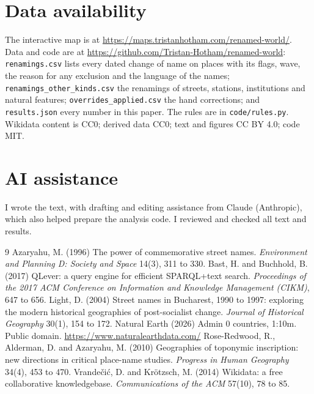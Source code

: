 \documentclass[11pt,a4paper]{article}
\begin{document}
\section{Data availability}
The interactive map is at \url{https://maps.tristanhotham.com/renamed-world/}. Data and code are at \url{https://github.com/Tristan-Hotham/renamed-world}: \texttt{renamings.csv} lists every dated change of name on places with its flags, wave, the reason for any exclusion and the language of the names; \texttt{renamings\_other\_kinds.csv} the renamings of streets, stations, institutions and natural features; \texttt{overrides\_applied.csv} the hand corrections; and \texttt{results.json} every number in this paper. The rules are in \texttt{code/rules.py}. Wikidata content is CC0; derived data CC0; text and figures CC BY 4.0; code MIT.

\section*{AI assistance}
I wrote the text, with drafting and editing assistance from Claude (Anthropic), which also helped prepare the analysis code. I reviewed and checked all text and results.

\begin{thebibliography}{9}
 Azaryahu, M. (1996) The power of commemorative street names. \textit{Environment and Planning D: Society and Space} 14(3), 311 to 330.
 Bast, H. and Buchhold, B. (2017) QLever: a query engine for efficient SPARQL+text search. \textit{Proceedings of the 2017 ACM Conference on Information and Knowledge Management (CIKM)}, 647 to 656.
 Light, D. (2004) Street names in Bucharest, 1990 to 1997: exploring the modern historical geographies of post-socialist change. \textit{Journal of Historical Geography} 30(1), 154 to 172.
 Natural Earth (2026) Admin 0 countries, 1:10m. Public domain. \url{https://www.naturalearthdata.com/}
 Rose-Redwood, R., Alderman, D. and Azaryahu, M. (2010) Geographies of toponymic inscription: new directions in critical place-name studies. \textit{Progress in Human Geography} 34(4), 453 to 470.
 Vrande\v{c}i\'c, D. and Kr\"otzsch, M. (2014) Wikidata: a free collaborative knowledgebase. \textit{Communications of the ACM} 57(10), 78 to 85.
\end{thebibliography}
\end{document}
